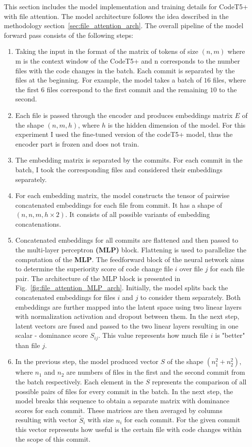 This section includes the model implementation and training details for CodeT5+ with file attention. The model architecture follows the idea described in the methodology section~\ref{sec:file_attention_arch}. The overall pipeline of the model forward pass consists of the following steps:
\begin{enumerate}
    \item Taking the input in the format of the matrix of tokens of size $(n, m)$ where m is the context window of the CodeT5+ and n corresponds to the number files with the code changes in the batch. Each commit is separated by the files at the beginning. For example, the model takes a batch of $16$ files, where the first $6$ files correspond to the first commit and the remaining $10$ to the second. 
    \item Each file is passed through the encoder and produces embeddings matrix $E$ of the shape $(n, m, h)$, where $h$ is the hidden dimension of the model. For this experiment I used the fine-tuned version of the codeT5+ model, thus the encoder part is frozen and does not train. 
    \item The embedding matrix is separated by the commits. For each commit in the batch, I took the corresponding files and considered their embeddings separately. 
    \item For each embedding matrix, the model constructs the tensor of pairwise concatenated embeddings for each file from commit. It has a shape of $(n, n, m, h \times 2)$. It consists of all possible variants of embedding concatenations.
    \item Concatenated embeddings for all commits are flattened and then passed to the multi-layer perceptron \textbf{ (MLP)} block. Flattening is used to parallelize the computation of the \textbf{MLP}. The feedforward block of the neural network aims to determine the superiority score of code change file $i$ over file $j$ for each file pair. The architecture of the MLP block is presented in Fig.~\ref{fig:file_attention_MLP_arch}. Initially, the model splits back the concatenated embeddings for files $i$ and $j$ to consider them separately. Both embeddings are further mapped into the latent space using two linear layers with normalization activation and dropout between them. In the next step, latent vectors are fused and passed to the two linear layers resulting in one scalar - dominance score $S_{ij}$. This value represents how much file $i$ is "better" than file $j$.  
    \item In the previous step, the model produced vector $S$ of the shape $(n_1^2 + n_2^2)$, where $n_1$ and $n_2$ are numbers of files in the first and the second commit from the batch respectively. Each element in the $S$ represents the comparison of all possible pairs of files for every commit in the batch. In the next step, the model breaks this sequence to obtain a separate matrix with dominance scores for each commit. These matrices are then averaged by columns resulting with vector $\tilde{S}_i$ with size $n_i$ for each commit. For the given commit this vector represents how useful is the certain file with code changes within the scope of this commit. 

\end{enumerate}
